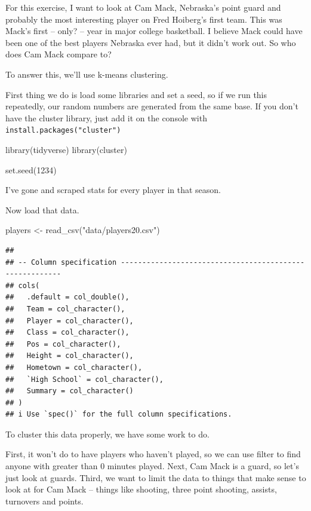 \documentclass[
]{book}
\newenvironment{Shaded}{\begin{snugshade}}{\end{snugshade}}
\newcommand{\DecValTok}[1]{\textcolor[rgb]{0.00,0.00,0.81}{#1}}
\newcommand{\FunctionTok}[1]{\textcolor[rgb]{0.00,0.00,0.00}{#1}}
\newcommand{\NormalTok}[1]{#1}
\newcommand{\OtherTok}[1]{\textcolor[rgb]{0.56,0.35,0.01}{#1}}
\newcommand{\StringTok}[1]{\textcolor[rgb]{0.31,0.60,0.02}{#1}}
\begin{document}
For this exercise, I want to look at Cam Mack, Nebraska's point guard and probably the most interesting player on Fred Hoiberg's first team. This was Mack's first -- only? -- year in major college basketball. I believe Mack could have been one of the best players Nebraska ever had, but it didn't work out. So who does Cam Mack compare to?

To answer this, we'll use k-means clustering.

First thing we do is load some libraries and set a seed, so if we run this repeatedly, our random numbers are generated from the same base. If you don't have the cluster library, just add it on the console with \texttt{install.packages("cluster")}

\begin{Shaded}
\begin{Highlighting}[]
\FunctionTok{library}\NormalTok{(tidyverse)}
\FunctionTok{library}\NormalTok{(cluster)}

\FunctionTok{set.seed}\NormalTok{(}\DecValTok{1234}\NormalTok{)}
\end{Highlighting}
\end{Shaded}

I've gone and scraped stats for every player in that season.

Now load that data.

\begin{Shaded}
\begin{Highlighting}[]
\NormalTok{players }\OtherTok{\textless{}{-}} \FunctionTok{read\_csv}\NormalTok{(}\StringTok{"data/players20.csv"}\NormalTok{)}
\end{Highlighting}
\end{Shaded}

\begin{verbatim}
## 
## -- Column specification --------------------------------------------------------
## cols(
##   .default = col_double(),
##   Team = col_character(),
##   Player = col_character(),
##   Class = col_character(),
##   Pos = col_character(),
##   Height = col_character(),
##   Hometown = col_character(),
##   `High School` = col_character(),
##   Summary = col_character()
## )
## i Use `spec()` for the full column specifications.
\end{verbatim}

To cluster this data properly, we have some work to do.

First, it won't do to have players who haven't played, so we can use filter to find anyone with greater than 0 minutes played. Next, Cam Mack is a guard, so let's just look at guards. Third, we want to limit the data to things that make sense to look at for Cam Mack -- things like shooting, three point shooting, assists, turnovers and points.
\end{document}

